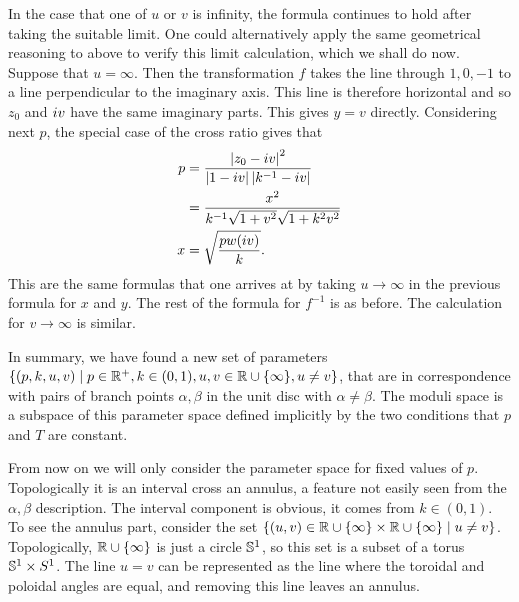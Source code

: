 In the case that one of $u$ or $v$ is infinity, the formula continues to hold after taking the suitable limit. One could alternatively apply the same geometrical reasoning to above to verify this limit calculation, which we shall do now. Suppose that $u=\infty$. Then the transformation $f$ takes the line through $1,0,-1$ to a line perpendicular to the imaginary axis. This line is therefore horizontal and so $z_0$ and $\iu v$ have the same imaginary parts. This gives $y=v$ directly. Considering next $p$, the special case of the cross ratio gives that
\begin{align}
p
&= \frac{\abs{z_0 -\iu v}^2}{\abs{1-\iu v}\abs{k^{-1}-\iu v}} \\
&= \frac{x^2}{k^{-1}\sqrt{1+v^2}\sqrt{1+k^2 v^2}} \\
x &= \sqrt{\frac{p w(\iu v)}{k}}.
\end{align}
This are the same formulas that one arrives at by taking $u \to \infty$ in the previous formula for $x$ and $y$. The rest of the formula for $f^{-1}$ is as before. The calculation for $v \to \infty$ is similar.

In summary, we have found a new set of parameters $\{(p,k,u,v) \mid p \in \R^+, k \in (0,1), u,v \in\RInf, u \neq v\}$, that are in correspondence with pairs of branch points $α,β$ in the unit disc with $α\neq β$. The moduli space is a subspace of this parameter space defined implicitly by the two conditions that $p$ and $T$ are constant.

From now on we will only consider the parameter space for fixed values of $p$. Topologically it is an interval cross an annulus, a feature not easily seen from the $α,β$ description. The interval component is obvious, it comes from $k\in (0,1)$. To see the annulus part, consider the set $\{ (u,v) \in \RInf \times \RInf \mid u \neq v \}$. Topologically, $\RInf$ is just a circle $\S^1$, so this set is a subset of a torus $\S^1 \times S^1$. The line $u=v$ can be represented as the line where the toroidal and poloidal angles are equal, and removing this line leaves an annulus.

